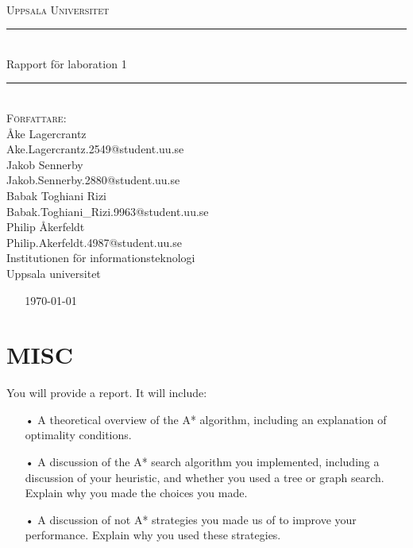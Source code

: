 \documentclass[a4paper, 11pt]{article}
\begin{document}
\begin{titlepage}
\newcommand{\HRule}{\rule{\linewidth}{0.5mm}}
\begin{center}

\textsc{\Large }\\[2.5cm]
\textsc{\LARGE Uppsala Universitet}\\[1.5cm] 

\HRule \\[0.3cm]
{ \huge \textup {Rapport för laboration 1}}\\[0.3cm]
\HRule \\[1.5cm]

\Large \textsc{Författare:}\\[0.5cm]

\large \textup{Åke Lagercrantz}\\
\large \textup{Ake.Lagercrantz.2549@student.uu.se}\\ [0.2cm]

\large \textup{Jakob Sennerby}\\
\large \textup{Jakob.Sennerby.2880@student.uu.se}\\[0.2cm]

\large \textup{Babak Toghiani Rizi}\\
\large \textup{Babak.Toghiani{\_}Rizi.9963@student.uu.se}\\[0.2cm]

\large \textup{Philip Åkerfeldt}\\
\large \textup{Philip.Akerfeldt.4987@student.uu.se}\\[0.5cm]

\large \textup{\textup{Institutionen för informationsteknologi}}\\
\large \textup{\textup{Uppsala universitet}}\\[0.6cm]
\end{center}
~ \hfill
\center
~
{\Large \today}\\[2cm]
\vfill

\end{titlepage}

\newpage

\section{MISC}
You will provide a report. It will include:
\begin{itemize}
\item[•] A theoretical overview of the A* algorithm, including an explanation of optimality
conditions.\\
\item[•] A discussion of the A* search algorithm you implemented, including a discussion of your heuristic, and whether you used a tree or graph search. Explain why you made the
choices you made. \\
\item[•] A discussion of not A* strategies you made us of to improve your performance. Explain why you used these strategies.\\
\end{itemize}
\end{document}
